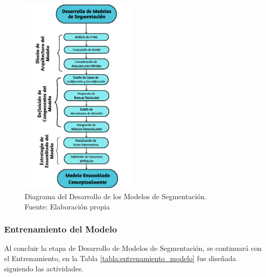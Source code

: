  
 \begin{figure}[h]
    \begin{center}
        \includegraphics[width=0.5\textwidth]{3/figures/Diagrama de Desarrollo.png}
        \caption[Diagrama del Desarrollo de los Modelos de Segmentación]{Diagrama del Desarrollo de los Modelos de Segmentación.\\
        Fuente: Elaboración propia}
        \label{3:fig5}
    \end{center}
\end{figure}

\subsubsection{Entrenamiento del Modelo}
Al concluir la etapa de Desarrollo de Modelos de Segmentación, se continuará con el Entrenamiento, en la Tabla \ref{tabla:entrenamiento_modelo} fue diseñada siguiendo las actividades.

